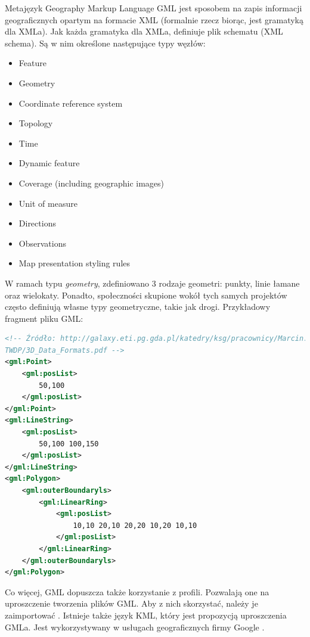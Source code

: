 Metajęzyk Geography Markup Language GML jest sposobem na zapis informacji geograficznych opartym na formacie XML (formalnie rzecz biorąc, jest gramatyką dla XMLa).
Jak każda gramatyka dla XMLa, definiuje plik schematu (XML schema). Są w nim określone następujące typy węzłów:
\begin{itemize}
    \item Feature
    \item Geometry
    \item Coordinate reference system
    \item Topology
    \item Time
    \item Dynamic feature
    \item Coverage (including geographic images)
    \item Unit of measure
    \item Directions
    \item Observations
    \item Map presentation styling rules
\end{itemize}

W ramach typu \textit{geometry}, zdefiniowano 3 rodzaje geometri: punkty, linie łamane oraz wielokaty.
Ponadto, społeczności skupione wokół tych samych projektów często definiują własne typy geometryczne, takie jak drogi.
Przykładowy fragment pliku GML:

\begin{lstlisting}[frame=L, language=xml]
<!-- Źródło: http://galaxy.eti.pg.gda.pl/katedry/ksg/pracownicy/Marcin.Kulawiak/
TWDP/3D_Data_Formats.pdf -->
<gml:Point>
    <gml:posList>
        50,100
    </gml:posList>
</gml:Point>
<gml:LineString>
    <gml:posList>
        50,100 100,150
    </gml:posList>
</gml:LineString>
<gml:Polygon>
    <gml:outerBoundaryls>
        <gml:LinearRing>
            <gml:posList>
                10,10 20,10 20,20 10,20 10,10
            </gml:posList>
        </gml:LinearRing>
    </gml:outerBoundaryls>
</gml:Polygon>
\end{lstlisting}

Co więcej, GML dopuszcza także korzystanie z profili. Pozwalają one na uproszczenie tworzenia plików GML. Aby z nich skorzystać, należy je zaimportować \cite{OpeGIS_GML2007}.
Istnieje także język KML, który jest propozycją uproszczenia GMLa. Jest wykorzystywany w usługach geograficznych firmy Google \cite{kulawiak2014}.

